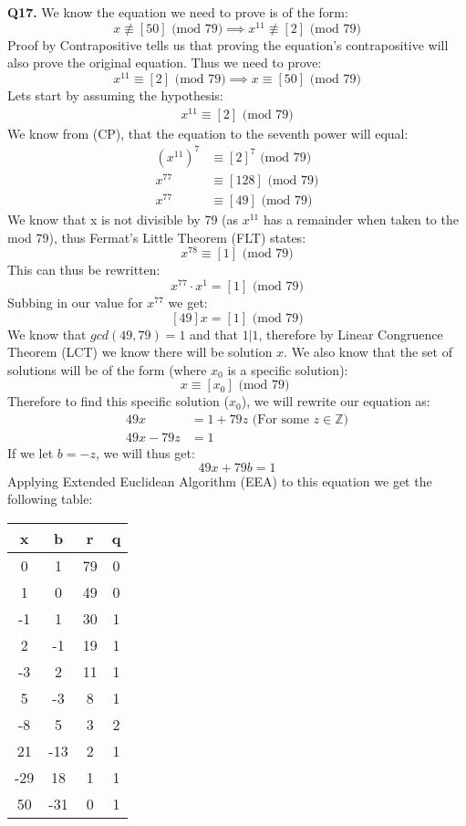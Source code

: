 \documentclass[11pt]{article}
\begin{document}
\parindent=0pt

\textbf{Q17.} We know the equation we need to prove is of the form:
\[ x \not\equiv [50] \text{ (mod 79)} \implies x^{11} \not\equiv [2] \text{ (mod 79)} \]
Proof by Contrapositive tells us that proving the equation's contrapositive will also prove the original equation. Thus we need to prove:
\[ x^{11} \equiv [2] \text{ (mod 79)}  \implies x \equiv [50] \text{ (mod 79)} \]
Lets start by assuming the hypothesis:
\begin{align*}
 x^{11} \equiv [2] \text{ (mod 79)} 
\end{align*}
We know from (CP), that the equation to the seventh power will equal:
\begin{align*}
 (x^{11})^7 &\equiv [2]^7 \text{ (mod 79)} \\
 x^{77} &\equiv [128] \text{ (mod 79)} \\
 x^{77} &\equiv [49] \text{ (mod 79)} 
\end{align*}
We know that x is not divisible by 79 (as $x^11$ has a remainder when taken to the mod 79), thus Fermat's Little Theorem (FLT) states: 
\[ x^{78} \equiv [1] \text{ (mod 79)} \] 
This can thus be rewritten:
\[ x^{77}\cdot x^1 = [1] \text{ (mod 79)} \]
Subbing in our value for $x^{77}$ we get:
\[ [49]x = [1] \text{ (mod 79)} \]
We know that $gcd(49,79) = 1$ and that $1|1$, therefore by Linear Congruence Theorem (LCT) we know there will be solution $x$. We also know that the set of solutions will be of the form (where $x_0$ is a specific solution):
\[ x \equiv [x_0] \text{ (mod 79) } \]
Therefore to find this specific solution ($x_0$), we will rewrite our equation as: 
\begin{align*}
 49x & = 1 + 79z \text{ (For some $z \in \mathbb{Z}$)}  \\
 49x - 79z  &= 1 
\end{align*}
If we let $b = -z$, we will thus get:
\[  49x + 79b  = 1 \]
Applying Extended Euclidean Algorithm (EEA) to this equation we get the following table:
\begin{center}
 \begin{tabular}{||c c c c||} 
 \hline
 x & b & r & q \\ [0.5ex] 
 \hline\hline
 0 & 1 & 79 & 0 \\ 
 \hline
 1 & 0 & 49 & 0 \\
 \hline
 -1 & 1 & 30 & 1 \\
 \hline
 2 & -1 & 19 & 1\\
 \hline
 -3 & 2 & 11 & 1\\ 
 \hline
 5 & -3  & 8 & 1 \\
 \hline
 -8 & 5 & 3 & 2 \\ 
 \hline
21 & -13 & 2 & 1\\ 
 \hline
-29 & 18 & 1 & 1\\ 
 \hline
50 & -31 & 0 & 1\\ 
 \hline
\end{tabular}
\end{center}
\end{document}
